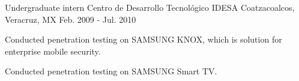 \begin{cventries}

\cventry
{Undergraduate intern} %
{Centro de Desarrollo Tecnológico IDESA} %
{Coatzacoalcos, Veracruz, MX} %
{Feb. 2009 - Jul. 2010} %
{ %
\begin{cvitems}
\item {Conducted penetration testing on SAMSUNG KNOX, which is solution for enterprise mobile security.}
\item {Conducted penetration testing on SAMSUNG Smart TV.}
\end{cvitems}
}


\end{cventries}
